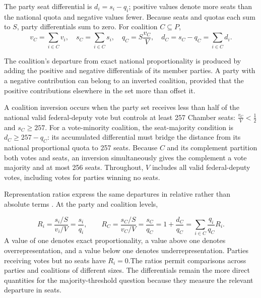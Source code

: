 \documentclass[11pt]{article}
\begin{document}
The party seat differential is $d_i=s_i-q_i$; positive values denote
more seats than the national quota and negative values fewer. Because seats and
quotas each sum to $S$, party differentials sum to zero. For coalition
$C\subseteq P$,
\[
v_C=\sum_{i\in C}v_i,\quad s_C=\sum_{i\in C}s_i,\quad
q_C=S\frac{v_C}{V},\quad d_C=s_C-q_C=\sum_{i\in C}d_i.
\]

The coalition's departure from exact national proportionality is produced by
adding the positive and negative differentials of its member parties. A party
with a negative contribution can belong to an inverted coalition, provided that
the positive contributions elsewhere in the set more than offset it.

A coalition inversion occurs when the party set receives less than half of the
national valid federal-deputy vote but controls at least 257 Chamber seats:
\(\frac{v_C}{V}<\frac{1}{2}\) and \(s_C\geq257.\)
For a vote-minority coalition, the seat-majority condition is
$d_C\geq257-q_C$: its accumulated differential must bridge the distance from
its national proportional quota to 257 seats. Because $C$ and its complement
partition both votes and seats, an inversion simultaneously gives the complement
a vote majority and at most 256 seats. Throughout, $V$ includes all valid
federal-deputy votes, including votes for parties winning no seats.


Representation ratios express the same departures in relative rather than absolute terms \parencite{taagepera1980proportionality}. At the party and coalition levels,

\[
R_i=\frac{s_i/S}{v_i/V}=\frac{s_i}{q_i},
\qquad
R_C=\frac{s_C/S}{v_C/V}
=\frac{s_C}{q_C}
=1+\frac{d_C}{q_C}
=\sum_{i\in C}\frac{q_i}{q_C}R_i.
\]
A value of one denotes exact proportionality, a value above one denotes overrepresentation, and a value below one denotes underrepresentation. Parties receiving votes but no seats have \(R_i=0\).The ratios permit comparisons across parties and coalitions of different sizes. The differentials remain the more direct quantities for the majority-threshold question because they measure the relevant departure in seats.
\end{document}
